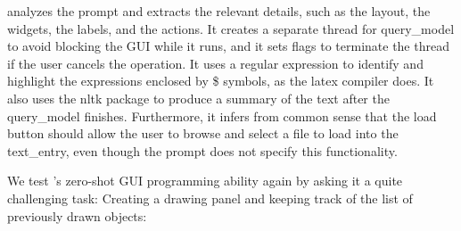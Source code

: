 \DV analyzes the prompt and extracts the relevant details, such as the layout, the widgets, the labels, and the actions. It creates a separate thread for query\_model to avoid blocking the GUI while it runs, and it sets flags to terminate the thread if the user cancels the operation. It uses a regular expression to identify and highlight the expressions enclosed by \$ symbols, as the latex compiler does. It also uses the nltk package to produce a summary of the text after the query\_model finishes. Furthermore, it infers from common sense that the load button should allow the user to browse and select a file to load into the text\_entry, even though the prompt does not specify this functionality.





We test \DV's zero-shot GUI programming ability again by asking it a quite challenging task: Creating a drawing panel and keeping track of the list of previously drawn objects:



